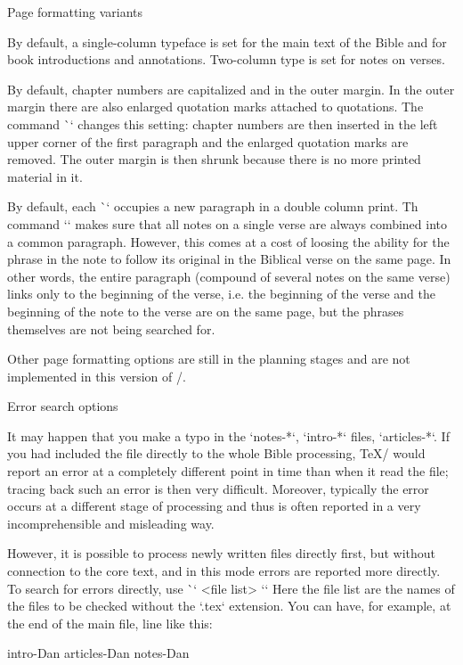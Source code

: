{{{{\endtt
\sec Page formatting variants

By default, a single-column typeface is set for the main text of the Bible
and for book introductions and annotations. Two-column type is set for
notes on verses.

By default, chapter numbers are capitalized and in the outer margin. 
In the outer margin there are also
enlarged quotation marks attached to quotations. 
The command \`\normalchapnumbers` changes this setting: chapter numbers are then inserted in the left
upper corner of the first paragraph and the enlarged quotation marks are removed.
The outer margin is then shrunk because there is no more printed material in it.  



By default, each \`\Note` occupies a new paragraph in a  double column print. 
Th command `\mergednotes` makes sure that all notes on a single verse are always 
combined into a common paragraph. 
However, this comes at a cost of loosing the ability for the phrase in the note
to follow its original in the Biblical verse on the same page.
In other words, the entire paragraph (compound of several notes on the same verse)
links only  to the beginning of the verse, i.e. the beginning of the verse 
and the beginning of the note to the verse are on the same page,
but the phrases themselves are not being searched for.

Other page formatting options are still in the planning stages and are not implemented in this version of \OpBible/.


\sec Error search options

It may happen that you make a typo in the `notes-*`, `intro-*` files,
`articles-*`. If you had included the file  directly to the whole Bible processing,
\TeX/ would report an error at a completely different point in time than when it read the file; 
tracing back such an error is then very difficult. Moreover, typically the error
occurs at a different stage of processing and thus is often reported in a very
incomprehensible and misleading way.

However, it is possible to process newly written files directly first, but without
connection to the core text, and in this mode errors are reported more directly.
To search for errors directly, use \`\checksyntax` <file list> `{}`
Here the file list are the names of the files to be checked without the `.tex` extension.
You can have, for example, at the end of the main file, line like this:

\begtt
\checksyntax intro-Dan articles-Dan notes-Dan {}
\endtt

}}}}
